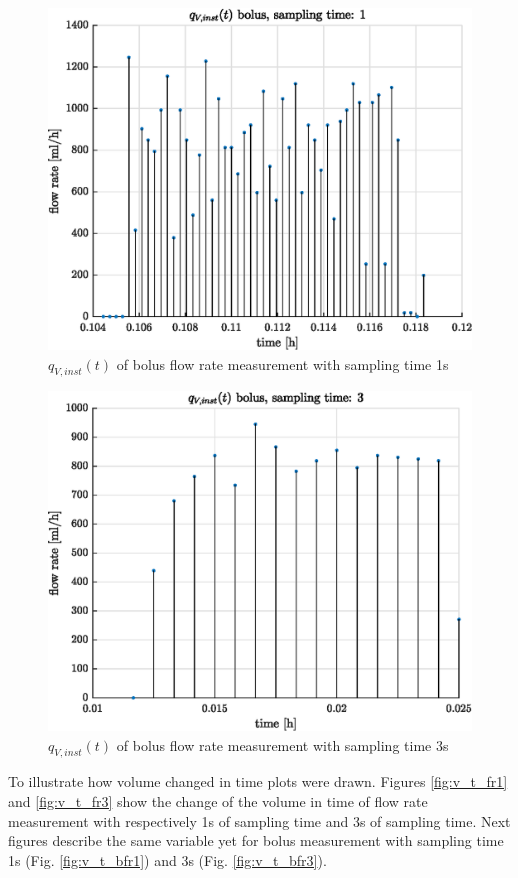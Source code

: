 \documentclass[12pt,a4paper]{article}
\begin{document}
	\newpage
	\begin{figure}[h!]
		\centering
		\includegraphics[width=0.8\linewidth]{figures/_q__V_inst__t___bolus__sampling_time__1.eps}
		\caption{$q_{V,inst}(t)$ of bolus flow rate measurement with sampling time 1s}
		\label{fig:q_t_bfr1}
	\end{figure}
	
	\begin{figure}[h!]
		\centering
		\includegraphics[width=0.8\linewidth]{figures/_q__V_inst__t___bolus__sampling_time__3.eps}
		\caption{$q_{V,inst}(t)$ of bolus flow rate measurement with sampling time 3s}
		\label{fig:q_t_bfr3}
	\end{figure}
	
	\newpage
	To illustrate how volume changed in time plots were drawn. Figures \ref{fig:v_t_fr1} and \ref{fig:v_t_fr3} show the change of the volume in time of flow rate measurement with respectively 1s of sampling time and 3s of sampling time. Next figures describe the same variable yet for bolus measurement with sampling time 1s (Fig. \ref{fig:v_t_bfr1}) and 3s (Fig. \ref{fig:v_t_bfr3}).
	
\end{document}
